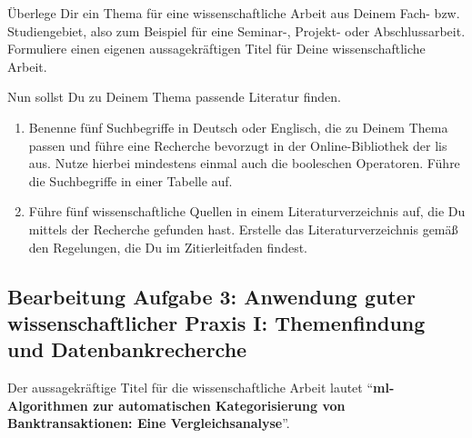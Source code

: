 
\begin{enumerate}[leftmargin=*]
	\itshape{
	\item Überlege Dir ein Thema für eine wissenschaftliche Arbeit aus Deinem Fach- bzw. Studiengebiet, also zum Beispiel für eine Seminar-, Projekt- oder Abschlussarbeit. Formuliere einen eigenen aussagekräftigen Titel für Deine wissenschaftliche Arbeit.
	\item Nun sollst Du zu Deinem Thema passende Literatur finden.
	      \begin{enumerate}
		      \item Benenne fünf Suchbegriffe in Deutsch oder Englisch, die zu Deinem Thema passen und führe eine Recherche bevorzugt in der Online-Bibliothek der \acrfull{lis} aus. Nutze hierbei mindestens einmal auch die booleschen Operatoren. Führe die Suchbegriffe in einer Tabelle auf.
		      \item Führe fünf wissenschaftliche Quellen in einem Literaturverzeichnis auf, die Du mittels der Recherche gefunden hast. Erstelle das Literaturverzeichnis gemäß den Regelungen, die Du im Zitierleitfaden findest.
	      \end{enumerate}}
\end{enumerate}

\clearpage

\subsection*{Bearbeitung Aufgabe 3: Anwendung guter wissenschaftlicher Praxis I: Themenfindung und Datenbankrecherche}


Der aussagekräftige Titel für die wissenschaftliche Arbeit lautet \enquote{\textbf{\acrlong{ml}-Algorithmen zur automatischen Kategorisierung von Banktransaktionen: Eine Vergleichsanalyse}}.

